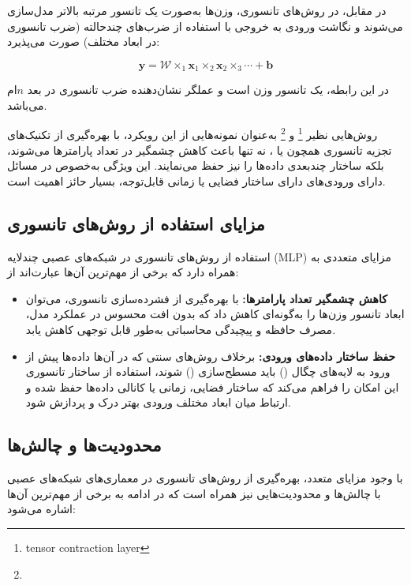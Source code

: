 در مقابل، در روش‌های تانسوری، وزن‌ها به‌صورت یک تانسور مرتبه بالاتر مدل‌سازی می‌شوند و نگاشت ورودی به خروجی با استفاده از ضرب‌های چندحالته (ضرب تانسوری در ابعاد مختلف) صورت می‌پذیرد:

\[
\mathbf{y} = \mathcal{W} \times_1 \mathbf{x}_1 \times_2 \mathbf{x}_2 \times_3 \cdots + \mathbf{b}
\]

در این رابطه،  یک تانسور وزن است و عملگر  نشان‌دهنده ضرب تانسوری در بعد $n$‌ام می‌باشد.

روش‌هایی نظیر  \footnote{tensor contraction layer} و  \footnote{} به‌عنوان نمونه‌هایی از این رویکرد، با بهره‌گیری از تکنیک‌های تجزیه تانسوری همچون  یا ، نه تنها باعث کاهش چشمگیر در تعداد پارامترها می‌شوند، بلکه ساختار چندبعدی داده‌ها را نیز حفظ می‌نمایند. این ویژگی به‌خصوص در مسائل دارای ورودی‌های دارای ساختار فضایی یا زمانی قابل‌توجه، بسیار حائز اهمیت است.


\subsection*{مزایای استفاده از روش‌های تانسوری}

استفاده از روش‌های تانسوری در شبکه‌های عصبی چندلایه (MLP) مزایای متعددی به همراه دارد که برخی از مهم‌ترین آن‌ها عبارت‌اند از:

\begin{itemize}
	\item \textbf{کاهش چشمگیر تعداد پارامترها:} با بهره‌گیری از فشرده‌سازی تانسوری، می‌توان ابعاد تانسور وزن‌ها را به‌گونه‌ای کاهش داد که بدون افت محسوس در عملکرد مدل، مصرف حافظه و پیچیدگی محاسباتی به‌طور قابل توجهی کاهش یابد.
	
	\item \textbf{حفظ ساختار داده‌های ورودی:} برخلاف روش‌های سنتی که در آن‌ها داده‌ها پیش از ورود به لایه‌های چگال () باید مسطح‌سازی () شوند، استفاده از ساختار تانسوری این امکان را فراهم می‌کند که ساختار فضایی، زمانی یا کانالی داده‌ها حفظ شده و ارتباط میان ابعاد مختلف ورودی بهتر درک و پردازش شود.
	

	
\end{itemize}


\subsection*{محدودیت‌ها و چالش‌ها}

با وجود مزایای متعدد، بهره‌گیری از روش‌های تانسوری در معماری‌های شبکه‌های عصبی با چالش‌ها و محدودیت‌هایی نیز همراه است که در ادامه به برخی از مهم‌ترین آن‌ها اشاره می‌شود:

